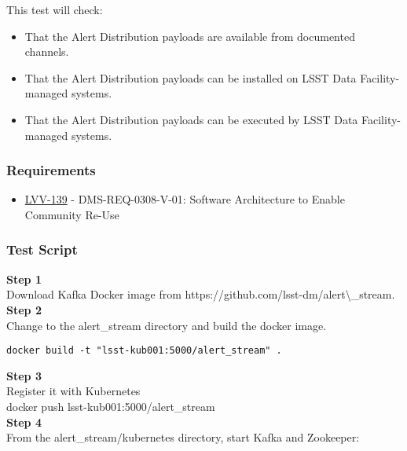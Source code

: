 This test will check:\\[2\baselineskip]

\begin{itemize}
\tightlist
\item
  That the Alert Distribution payloads are available from documented
  channels.
\item
  That the Alert Distribution payloads can be installed on LSST Data
  Facility-managed systems.
\item
  That the Alert Distribution payloads can be executed by LSST Data
  Facility-managed systems.
\end{itemize}

\subsubsection{Requirements}\label{requirements-6}

\begin{itemize}
\tightlist
\item
  \href{https://jira.lsstcorp.org/browse/LVV-139}{LVV-139} -
  DMS-REQ-0308-V-01: Software Architecture to Enable Community Re-Use
\end{itemize}

\subsubsection{Test Script}\label{test-script-6}

\textbf{Step 1}\\
Download Kafka Docker image from
https://github.com/lsst-dm/alert\textbackslash{}\_stream.\\[2\baselineskip]\textbf{Step
2}\\
Change to the alert\_stream directory and build the docker image.\\

\begin{verbatim}
docker build -t "lsst-kub001:5000/alert_stream" .
\end{verbatim}

\textbf{Step 3}\\
Register it with Kubernetes\\[2\baselineskip]docker push
lsst-kub001:5000/alert\_stream\\[2\baselineskip]\textbf{Step 4}\\
From the alert\_stream/kubernetes directory, start Kafka and
Zookeeper:\\[2\baselineskip]

